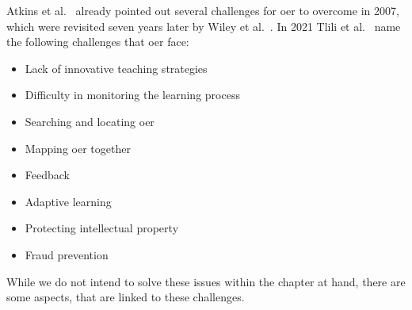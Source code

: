 Atkins et al.~\cite{atkins:2007:review} already pointed out several challenges for \acrshort{oer} to overcome in 2007, which were revisited seven years later by Wiley et al.~\cite{wiley:2014:oer}. In 2021  Tlili et al.~\cite{tlili:2021:towards} name the following challenges that \acrshort{oer} face:
\begin{itemize}
	\setlength{\itemsep}{-0.3cm}
	\item Lack of innovative teaching strategies
	\item Difficulty in monitoring the learning process
	\item Searching and locating \acrshort{oer}
	\item Mapping \acrshort{oer} together
	\item Feedback
	\item Adaptive learning
	\item Protecting intellectual property
	\item Fraud prevention
\end{itemize}

While we do not intend to solve these issues within the chapter at hand, there are some aspects, that are linked to these challenges.

